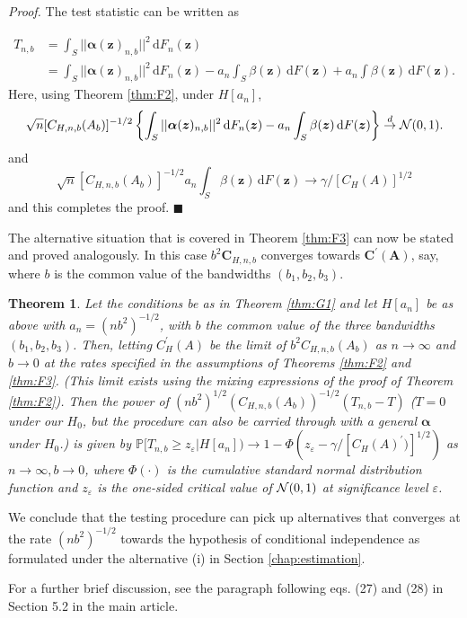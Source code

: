 \documentclass[
  12pt,
  letterpaper]{article}
\newtheorem{thm}{Theorem}[section]
\numberwithin{equation}{section}
\newcommand{\z}{\bm{z}}
\newcommand{\fC}{\bm{C}}
\newcommand{\fA}{\bm{A}}
\newcommand{\falpha}{\bm{\alpha}}
\newcommand{\di}{\,\textrm{d}}
\begin{document}
\emph{Proof.} The test statistic can be written as

\begin{align*}
T_{n,b} & = \int_S ||{\falpha}(\z)_{n,b}||^2 \di F_n(\z) \\
&= \int _S ||{\falpha}(\z)_{n,b}||^2 \di F_n(\z) - a_n \int_S \beta(\z) \di F(\z) + a_n \int \beta(\z) \di F(\z).
\end{align*}
Here, using Theorem \ref{thm:F2}, under \(H[a_n]\),
\[
\sqrt{n}[C_{H,n,b}(A_b)]^{-1/2}\left\{\int_S ||{\falpha}(\z)_{n,b}||^2 \di F_n(\z) - a_n \int_S \beta(\z) \di F(\z)\right\} \stackrel{d}{\to} {\cal N}(0,1).
\]
and
\[
\sqrt{n}[C_{H,n,b}(A_b)]^{-1/2} a_n \int_S \beta(\z) \di F(\z) \to \gamma/[C_H(A)]^{1/2}
\]
and this completes the proof. \(\blacksquare\)

The alternative situation that is covered in Theorem \ref{thm:F3} can now be stated and proved analogously. In this case \(b^2\fC_{H,n,b}\) converges towards \(\fC^{\prime}(\fA)\), say, where \(b\) is the common value of the bandwidths \((b_1,b_2,b_3)\).

\begin{thm}
Let the conditions be as in Theorem \ref{thm:G1} and let $H[a_n]$ be as above with $a_n =(nb^2)^{-1/2}$, with $b$ the common value of the three bandwidths $(b_1,b_2,b_3)$. Then, letting $C_H^{\prime}(A)$ be the limit of $b^2C_{H,n,b}(A_b)$ as $n \to \infty$ and $b \to 0$ at the rates specified in the assumptions of Theorems \ref{thm:F2} and \ref{thm:F3}. (This limit exists using the mixing expressions of the proof of Theorem \ref{thm:F2}). Then the power of $(nb^2)^{1/2}(C_{H,n,b}(A_b))^{-1/2}(T_{n,b}-T)$ ($T = 0$ under our $H_0$, but the procedure can also be carried through with a general ${\falpha}$ under $H_0$.) is given by $\mathbb{P}[T_{n,b} \geq z_{\varepsilon}|H[a_n]) \to 1-\Phi(z_{\varepsilon}-\gamma/[C_{H}(A)^{\prime})]^{1/2})$ as $n \to \infty, b \to 0$, where $\Phi(\cdot)$ is the cumulative standard normal distribution function and $z_{\varepsilon}$ is the one-sided critical value of ${\cal N}(0,1)$ at significance level $\varepsilon$.
\label{thm:G2}
\end{thm}

We conclude that the testing procedure can pick up alternatives that converges at the rate \((nb^2)^{-1/2}\) towards the hypothesis of conditional independence as formulated under the alternative (i) in Section \ref{chap:estimation}.

For a further brief discussion, see the paragraph following eqs. (27) and (28) in Section 5.2 in the main article.
\end{document}
